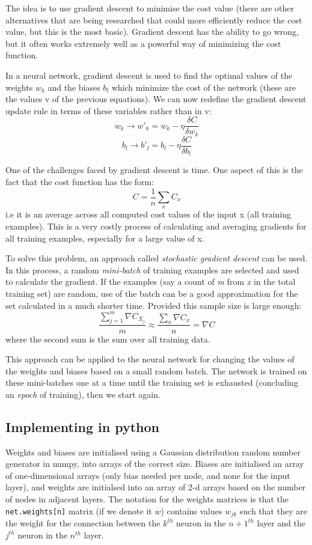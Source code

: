 \documentclass[a4paper,12pt]{article}
\begin{document}
The idea is to use gradient descent to minimise the cost value (there are other alternatives that are being researched that could more efficiently reduce the cost value, but this is the most basic). Gradient descent has the ability to go wrong, but it often works extremely well as a powerful way of minimizing the cost function.

In a neural network, gradient descent is used to find the optimal values of the weights $w_k$ and the biases $b_l$ which minimize the cost of the network (these are the values v of the previous equations). We can now redefine the gradient descent update rule in terms of these variables rather than in v: $$w_k \rightarrow w'_k=w_k-\eta \frac{\delta C}{\delta w_k}$$ $$b_l \rightarrow b'_l=b_l-\eta \frac{\delta C}{\delta b_l}$$

One of the challenges faced by gradient descent is time. One aspect of this is the fact that the cost function has the form: $$C=\frac{1}{n}\sum_xC_x$$ i.e it is an average across all computed cost values of the input x (all training examples). This is a very costly process of calculating and averaging gradients for all training examples, especially for a large value of x.

To solve this problem, an approach called \textit{stochastic gradient descent} can be used. In this process, a random \textit{mini-batch} of training examples are selected and used to calculate the gradient. If the examples (say a count of \textit{m} from \textit{x} in the total training set) are random, use of the batch can be a good approximation for the set calculated in a much shorter time. Provided this sample size is large enough:$$\frac{\sum_{j=1}^m \nabla C_{X_j}}{m} \approx \frac{\sum_x \nabla C_x}{n}=\nabla C$$ where the second sum is the sum over all training data.

This approach can be applied to the neural network for changing the values of the weights and biases based on a small random batch. The network is trained on these mini-batches one at a time until the training set is exhausted (concluding an \textit{epoch} of training), then we start again.

\subsection{Implementing in python}
Weights and biases are initialised using a Gaussian distribution random number generator in numpy, into arrays of the correct size. Biases are initialised an array of one-dimensional arrays (only bias needed per node, and none for the input layer), and weights are initialsed into an array of 2-d arrays based on the number of nodes in adjacent layers. The notation for the weights matrices is that the \texttt{net.weights[n]} matrix (if we denote it $w$) contains values $w_{jk}$ such that they are the weight for the connection between the $k^{th}$ neuron in the $n+1^{th}$ layer and the $j^{th}$ neuron in the $n^{th}$ layer.
\end{document}
